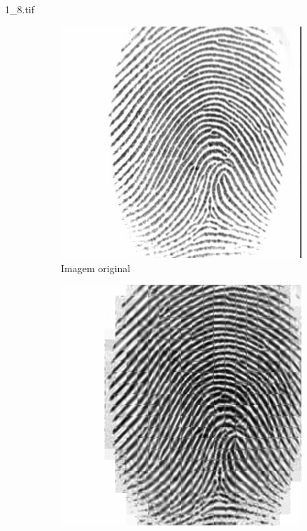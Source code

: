 \documentclass{beamer}
\begin{document}
    \begin{frame}{1\_8.tif}
        \begin{figure}
            \centering
            \begin{subfigure}[!ht]{0.32\textwidth}
                \includegraphics[width=\columnwidth]{Fingerprints/1_8.jpg}
                \caption{Imagem original}
            \end{subfigure}
            \begin{subfigure}[!ht]{0.32\textwidth}
                \includegraphics[width=\columnwidth]{Fingerprints/1_8_intermediate.jpg}

\end{subfigure}
\end{figure}
\end{frame}
\end{document}
